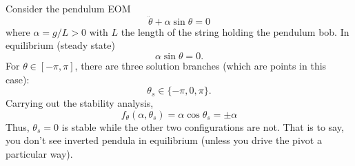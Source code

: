 \documentclass{article}
\theoremstyle{definition}
\theoremstyle{remark}
\theoremstyle{remark}
\begin{document}
\begin{tcolorbox}[title=Example 2]
	Consider the pendulum EOM
	$$
	\ddot \theta+\alpha \sin \theta= 0
	$$
	where $\alpha=g/L>0$ with $L$ the length of the string holding the pendulum bob. In equilibrium (steady state) 
	$$
\alpha\sin\theta = 0.
	$$
For $\theta\in[-\pi,\pi]$, there are three solution branches (which are points in this case):
$$
\theta_s \in\{-\pi, 0, \pi\}.
$$
Carrying out the stability analysis,
$$
f_\theta(\alpha, \theta_s) = \alpha \cos \theta_s=\pm\alpha
$$
Thus, $\theta_s = 0$ is stable while the other two configurations are not. That is to say, you don't see inverted pendula in equilibrium (unless you drive the pivot a particular way). 

\end{tcolorbox}
\end{document}
